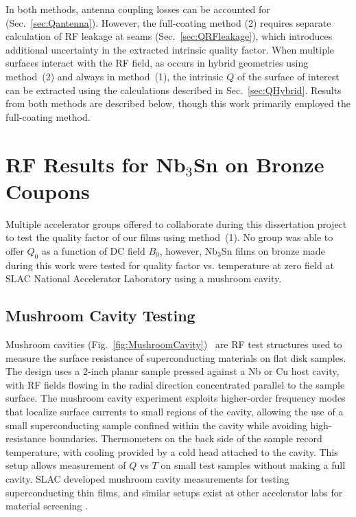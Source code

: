 In both methods, antenna coupling losses can be accounted for (Sec.~\ref{sec:Qantenna}). However, the full-coating method (2) requires separate calculation of RF leakage at seams (Sec.~\ref{sec:QRFleakage}), which introduces additional uncertainty in the extracted intrinsic quality factor. When multiple surfaces interact with the RF field, as occurs in hybrid geometries using method~(2) and always in method~(1), the intrinsic $Q$ of the surface of interest can be extracted using the calculations described in Sec.~\ref{sec:QHybrid}. Results from both methods are described below, though this work primarily employed the full-coating method.


\section{RF Results for \texorpdfstring{Nb$_3$Sn}{Nb3Sn} on Bronze Coupons}

Multiple accelerator groups offered to collaborate during this dissertation project to test the quality factor of our films using method~(1). No group was able to offer $Q_0$ as a function of DC field $B_0$, however, Nb$_3$Sn films on bronze made during this work were tested for quality factor vs. temperature at zero field at SLAC National Accelerator Laboratory using a mushroom cavity. 

 \subsection{Mushroom Cavity Testing}\label{sec:mushroomCavity}

    Mushroom cavities (Fig.~\ref{fig:MushroomCavity})~\cite{tantawiSuperconductingMaterialsTesting2007, thomsonSRF2015Whistler2015} are RF test structures used to measure the surface resistance of superconducting materials on flat disk samples. The design uses a 2-inch planar sample pressed against a Nb or Cu host cavity, with RF fields flowing in the radial direction concentrated parallel to the sample surface. The mushroom cavity experiment exploits higher-order frequency modes that localize surface currents to small regions of the cavity, allowing the use of a small superconducting sample confined within the cavity while avoiding high-resistance boundaries. Thermometers on the back side of the sample record temperature, with cooling provided by a cold head attached to the cavity. This setup allows measurement of $Q$ vs $T$ on small test samples without making a full cavity. SLAC developed mushroom cavity measurements for testing superconducting thin films, and similar setups exist at other accelerator labs for material screening \cite{oikawaFabricationNbMushroom2019}. 

